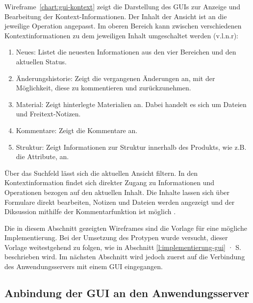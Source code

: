 Wireframe~\ref{chart:gui-kontext} zeigt die Darstellung des GUIs zur Anzeige und Bearbeitung der Kontext-Informationen. Der Inhalt der Ansicht ist an die jeweilige Operation angepasst. Im oberen Bereich kann zwischen verschiedenen Kontextinformationen zu dem jeweiligen Inhalt umgeschaltet werden  (v.l.n.r): 

\begin{enumerate}\itemsep -5pt
\item Neues: Listet die neuesten Informationen aus den vier Bereichen und den aktuellen Status.
\item Änderungshistorie: Zeigt die vergangenen Änderungen an, mit der Möglichkeit, diese zu kommentieren und zurückzunehmen.
\item Material: Zeigt hinterlegte Materialien an. Dabei handelt es sich um Dateien und Freitext-Notizen.
\item Kommentare: Zeigt die Kommentare an.
\item Struktur: Zeigt Informationen zur Struktur innerhalb des Produkts, wie z.B. die Attribute, an.
\end{enumerate}

Über das Suchfeld  lässt sich die aktuellen Ansicht filtern. In den Kontextinformation findet sich direkter Zugang zu Informationen und Operationen bezogen auf den aktuellen Inhalt. Die Inhalte lassen sich über Formulare  direkt bearbeiten, Notizen und Dateien werden angezeigt  und der Diksussion mithilfe der Kommentarfunktion ist möglich .

\pagebreak

\secbar

Die in diesem Abschnitt gezeigten Wireframes sind die Vorlage für eine mögliche Implementierung. Bei der Umsetzung des Protypen wurde versucht, dieser Vorlage weitestgehend zu folgen, wie in Abschnitt \ref{l:implementierung-gui} · S.\pageref{l:implementierung-gui} beschrieben wird. Im nächsten Abschnitt wird jedoch zuerst auf die Verbindung des Anwendungsservers mit einem GUI eingegangen.

\pagebreak

\subsection{Anbindung der GUI an den Anwendungsserver}\label{l:anbindung-gui}

